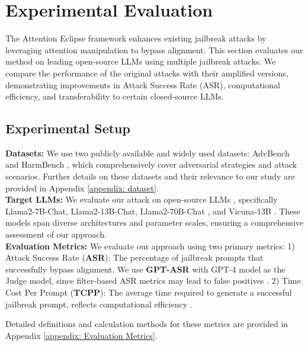 \section{Experimental Evaluation}

The Attention Eclipse framework enhances existing jailbreak attacks by leveraging attention manipulation to bypass alignment. This section evaluates our method on leading open-source LLMs using multiple jailbreak attacks. We compare the performance of the original attacks with their amplified versions, demonstrating improvements in Attack Success Rate (ASR), computational efficiency, and transferability to certain closed-source LLMs.

\subsection{Experimental Setup}


\noindent \textbf{Datasets:} We use two publicly available and widely used datasets: AdvBench \cite{zou2023universal} and HarmBench \cite{mazeika2024harmbench}, which comprehensively cover adversarial strategies and attack scenarios. Further details on these datasets and their relevance to our study are provided in Appendix \ref{appendix: dataset}. \\

\noindent \textbf{Target LLMs:} We evaluate our attack on open-source LLMs \cite{kukreja2024literature}, specifically Llama2-7B-Chat, Llama2-13B-Chat, Llama2-70B-Chat \cite{touvron2023llama}, and Vicuna-13B \cite{chiang2023vicuna}. These models span diverse architectures and parameter scales, ensuring a comprehensive assessment of our approach. \\

\noindent \textbf{Evaluation Metrics:} We evaluate our approach using two primary metrics:  
1) Attack Success Rate (\textbf{ASR}): The percentage of jailbreak prompts that successfully bypass alignment. We use \textbf{GPT-ASR} \cite{ding2023wolf} with GPT-4 model as the Judge model, since filter-based ASR metrics may lead to false positives \cite{liu2023autodan, chao2023jailbreaking}.
2) Time Cost Per Prompt (\textbf{TCPP}): The average time required to generate a successful jailbreak prompt, reflects computational efficiency \cite{ding2023wolf}.  

Detailed definitions and calculation methods for these metrics are provided in Appendix \ref{appendix: Evaluation Metrics}. \\


